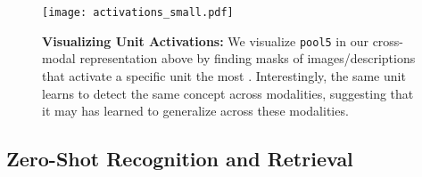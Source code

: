 \documentclass[10pt,journal,compsoc]{IEEEtran}
\begin{document}
	
	\begin{figure*}
        \begin{center}
            \texttt{[image: activations\_small.pdf]} 
        \end{center}
        \caption{\textbf{Visualizing Unit Activations:} We visualize \texttt{pool5} in our cross-modal representation above by finding masks of images/descriptions that activate a specific unit the most \cite{zhou2014object}. Interestingly, the same unit learns to detect the same concept across modalities, suggesting that it may has learned to generalize across these modalities.}
        
       
        \label{fig:activations}
    \end{figure*}
    
    
    \subsection{Zero-Shot Recognition and Retrieval}
    
\end{document}
